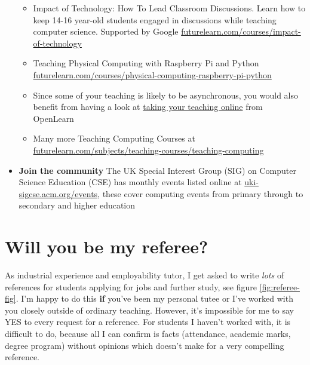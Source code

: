 \documentclass[
  12pt,
]{book}
\providecommand{\tightlist}{%
  \setlength{\itemsep}{0pt}\setlength{\parskip}{0pt}}
\begin{document}
\begin{itemize}
  \begin{itemize}
  \tightlist
  \item
    Impact of Technology: How To Lead Classroom Discussions. Learn how to keep 14-16 year-old students engaged in discussions while teaching computer science. Supported by Google \href{https://www.futurelearn.com/courses/impact-of-technology}{futurelearn.com/courses/impact-of-technology}
  \item
    Teaching Physical Computing with Raspberry Pi and Python \href{https://www.futurelearn.com/courses/physical-computing-raspberry-pi-python}{futurelearn.com/courses/physical-computing-raspberry-pi-python}
  \item
    Since some of your teaching is likely to be asynchronous, you would also benefit from having a look at \href{https://www.open.edu/openlearn/education-development/education/take-your-teaching-online/content-section-overview}{taking your teaching online} from OpenLearn
  \item
    Many more Teaching Computing Courses at \href{https://www.futurelearn.com/subjects/teaching-courses/teaching-computing}{futurelearn.com/subjects/teaching-courses/teaching-computing}
  \end{itemize}
\item
  \textbf{Join the community} The UK Special Interest Group (SIG) on Computer Science Education (CSE) has monthly events listed online at \href{https://uki-sigcse.acm.org/events}{uki-sigcse.acm.org/events}, these cover computing events from primary through to secondary and higher education
\end{itemize}

\hypertarget{referee}{%
\chapter{Will you be my referee?}\label{referee}}

As industrial experience and employability tutor, I get asked to write \emph{lots} of references for students applying for jobs and further study, see figure \ref{fig:referee-fig}. I'm happy to do this \textbf{if} you've been my personal tutee or I've worked with you closely outside of ordinary teaching. However, it's impossible for me to say YES to every request for a reference. For students I haven't worked with, it is difficult to do, because all I can confirm is facts (attendance, academic marks, degree program) without opinions which doesn't make for a very compelling reference.
\end{document}
